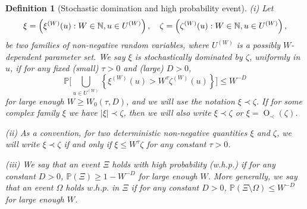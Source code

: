 \documentclass{article}
\newcommand{\1}{\mathds{1}}
\numberwithin{equation}{section}
\renewcommand{\epsilon}{\varepsilon}
\renewcommand{\leq}{\leqslant}
\renewcommand{\geq}{\geqslant}
\renewcommand{\le}{\leq}
\renewcommand{\ge}{\geq}
\renewcommand{\P}{\mathbb{P}}
\DeclareMathOperator{\OO}{O}
\theoremstyle{plain} %
\newtheorem{definition}[theorem]{Definition}
\theoremstyle{remark}
\begin{document}
\begin{definition}[Stochastic domination and high probability event]\label{stoch_domination}
	(i) Let
	\[\xi=\left(\xi^{(W)}(u):W\in\mathbb N, u\in U^{(W)}\right),\hskip 10pt \zeta=\left(\zeta^{(W)}(u):W\in\mathbb N, u\in U^{(W)}\right),\]
	be two families of non-negative random variables, where $U^{(W)}$ is a possibly $W$-dependent parameter set. We say $\xi$ is stochastically dominated by $\zeta$, uniformly in $u$, if for any fixed (small) $\tau>0$ and (large) $D>0$, 
	\[\mathbb P\bigg[\bigcup_{u\in U^{(W)}}\left\{\xi^{(W)}(u)>W^\tau\zeta^{(W)}(u)\right\}\bigg]\le W^{-D}\]
	for large enough $W\ge W_0(\tau, D)$, and we will use the notation $\xi\prec\zeta$. 
	If for some complex family $\xi$ we have $|\xi|\prec\zeta$, then we will also write $\xi \prec \zeta$ or $\xi=\OO_\prec(\zeta)$. 
	
	\vspace{5pt}
	\noindent (ii) As a convention, for two deterministic non-negative quantities $\xi$ and $\zeta$, we will write $\xi\prec\zeta$ if and only if $\xi\le W^\tau \zeta$ for any constant $\tau>0$. 
	
	
	\vspace{5pt}
	\noindent (iii) We say that an event $\Xi$ holds with high probability (w.h.p.) if for any constant $D>0$, $\mathbb P(\Xi)\ge 1- W^{-D}$ for large enough $W$. More generally, we say that an event $\Omega$ holds $w.h.p.$ in $\Xi$ if for any constant $D>0$,
	$\P( \Xi\setminus \Omega)\le W^{-D}$ for large enough $W$.
\end{definition}
\end{document}
